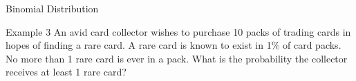 \documentclass[10pt]{beamer}
\begin{document}
\begin{frame}[fragile]{Binomial Distribution}
\begin{exampleblock}{Example 3}
An avid card collector wishes to purchase 10 packs of trading cards in hopes of finding a rare card. A rare card is known to exist in 1\% of card packs. No more than 1 rare card is ever in a pack. What is the probability the collector receives at least 1 rare card?
\end{exampleblock}
\end{frame}


\end{document}
